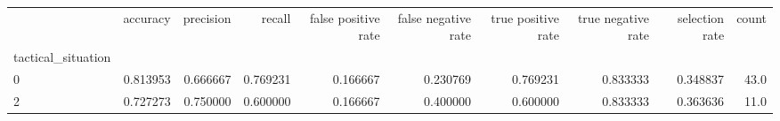 \begin{tabular}{lrrrrrrrrr}
\toprule
{} &  accuracy &  precision &    recall &  false positive rate &  false negative rate &  true positive rate &  true negative rate &  selection rate &  count \\
tactical\_situation &           &            &           &                      &                      &                     &                     &                 &        \\
\midrule
0                  &  0.813953 &   0.666667 &  0.769231 &             0.166667 &             0.230769 &            0.769231 &            0.833333 &        0.348837 &   43.0 \\
2                  &  0.727273 &   0.750000 &  0.600000 &             0.166667 &             0.400000 &            0.600000 &            0.833333 &        0.363636 &   11.0 \\
\bottomrule
\end{tabular}
